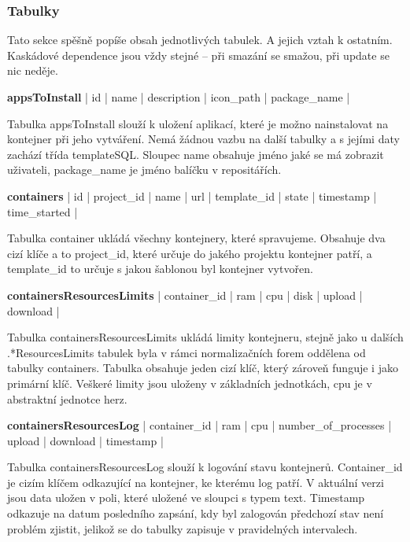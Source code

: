 \documentclass[a4paper,oneside,12pt]{report}
\begin{document}
\subsubsection{Tabulky}

Tato sekce spěšně popíše obsah jednotlivých tabulek. A jejich vztah k ostatním. Kaskádové dependence jsou vždy stejné -- při smazání se smažou, při update se nic neděje.

\vspace{0.3cm}
\noindent
\textbf{appsToInstall} | id | name | description | icon\_path | package\_name |

Tabulka appsToInstall slouží k uložení aplikací, které je možno nainstalovat na kontejner při jeho vytváření.
Nemá žádnou vazbu na další tabulky a s jejími daty zachází třída templateSQL.
Sloupec name obsahuje jméno jaké se má zobrazit uživateli, package\_name je jméno balíčku v repositářích.

\vspace{0.3cm}
\noindent
\textbf{containers} | id | project\_id | name | url | template\_id | state | timestamp \linebreak[4] | time\_started |

Tabulka container ukládá všechny kontejnery, které spravujeme.
Obsahuje dva cizí klíče a to project\_id, které určuje do jakého projektu kontejner patří, a template\_id to určuje s jakou šablonou byl kontejner vytvořen.


\vspace{0.3cm}
\noindent
\textbf{containersResourcesLimits} | container\_id | ram | cpu | disk | upload | download |

Tabulka containersResourcesLimits ukládá limity kontejneru, stejně jako u dalších .*ResourcesLimits tabulek byla v rámci normalizačních forem oddělena od tabulky containers.
Tabulka obsahuje jeden cizí klíč, který zároveň funguje i jako primární klíč.
Veškeré limity jsou uloženy v základních jednotkách, cpu je v abstraktní jednotce herz.

\vspace{0.3cm}
\noindent
\textbf{containersResourcesLog} | container\_id | ram | cpu | number\_of\_processes | upload | download | timestamp |

Tabulka containersResourcesLog slouží k logování stavu kontejnerů.
Container\_id je cizím klíčem odkazující na kontejner, ke kterému log patří.
V aktuální verzi jsou data uložen v poli, které uložené ve sloupci s typem text.
Timestamp odkazuje na datum posledního zapsání, kdy byl zalogován předchozí stav není problém zjistit, jelikož se do tabulky zapisuje v pravidelných intervalech.
\end{document}
